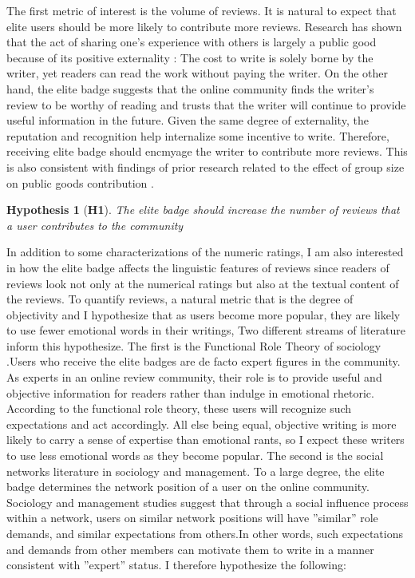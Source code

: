 \documentclass[12pt]{article}%
\begin{document}
The first metric of interest is the volume of reviews. It is natural to expect that elite users should be more likely to contribute more reviews. Research has shown that the act of sharing one’s experience with others is largely a public good because of its positive externality \citep{bolton2004effective,chen2010social}: The cost to write is solely borne by the writer, yet readers can read the work without paying the writer. On the other hand, the elite badge suggests that the online community finds the writer’s review to be worthy of reading and trusts that the writer will continue to provide useful information in the future. Given the same degree of externality, the reputation and recognition help internalize some incentive to write. Therefore, receiving elite badge should encmyage the writer to contribute more reviews. This is also consistent with findings of prior research related to the effect of group size on public goods contribution \citep{zhang2011group}. 

\textbf{Hypothesis 1} (\textbf{H1}). \emph{The elite badge should increase the number of reviews that a user contributes to the community}

In addition to some characterizations of the numeric ratings, I am also interested in how the elite badge affects the linguistic features of reviews since readers of reviews look not only at the numerical ratings but also at the textual content of the reviews. To quantify reviews, a natural metric that  is the degree of objectivity and I hypothesize that as users become more popular, they are likely to use fewer emotional words in their writings, Two different streams of literature inform this hypothesize. The first is the Functional Role Theory of sociology \citep{biddle1986recent}.Users who receive the elite badges are de facto expert figures in the community. As experts in an online review community, their role is to provide useful and objective information for readers rather than indulge in emotional rhetoric. According to the functional role theory, these users will recognize such expectations and act accordingly. All else being equal, objective writing is more likely to carry a sense of expertise than emotional rants, so I expect these writers to use less emotional words as they become popular. The second is the social networks literature in sociology and management. To a large degree, the elite badge determines the network position of a user on the online community. Sociology and management studies suggest that through a social influence process within a network\citep{marsden1993network}, users on similar network positions will have ''similar'' role demands, and similar expectations from others\citep{ibarra1993power}.In other words, such expectations and demands from other members can motivate them to write in a manner consistent with ''expert'' status. I therefore hypothesize the following:
\end{document}
